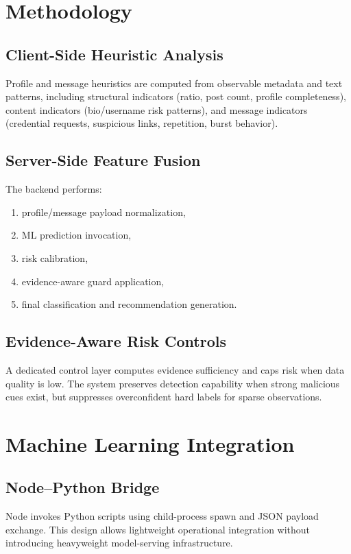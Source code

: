 ﻿\documentclass[conference]{IEEEtran}
\begin{document}
\section{Methodology}
\subsection{Client-Side Heuristic Analysis}
Profile and message heuristics are computed from observable metadata and text patterns, including structural indicators (ratio, post count, profile completeness), content indicators (bio/username risk patterns), and message indicators (credential requests, suspicious links, repetition, burst behavior).

\subsection{Server-Side Feature Fusion}
The backend performs:
\begin{enumerate}
\item profile/message payload normalization,
\item ML prediction invocation,
\item risk calibration,
\item evidence-aware guard application,
\item final classification and recommendation generation.
\end{enumerate}

\subsection{Evidence-Aware Risk Controls}
A dedicated control layer computes evidence sufficiency and caps risk when data quality is low. The system preserves detection capability when strong malicious cues exist, but suppresses overconfident hard labels for sparse observations.

\section{Machine Learning Integration}
\subsection{Node--Python Bridge}
Node invokes Python scripts using child-process spawn and JSON payload exchange. This design allows lightweight operational integration without introducing heavyweight model-serving infrastructure.
\end{document}
